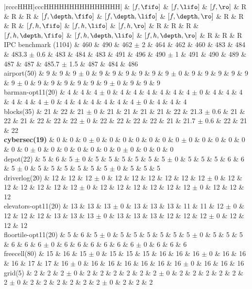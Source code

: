 \begin{center}
\begin{tabular}{|rcccHHH|cccHHHHHHHHHHHHHHH|}
\hline
 & \([f,\fifo]\) & \([f,\lifo]\) & \([f,\ro]\) & R & R & R & \([f,\depth,\fifo]\) & \([f,\depth,\lifo]\) & \([f,\depth,\ro]\) & R & R & R & \([f,h,\fifo]\) & \([f,h,\lifo]\) & \([f,h,\ro]\) & R & R & R & \([f,h,\depth,\fifo]\) & \([f,h,\depth,\lifo]\) & \([f,h,\depth,\ro]\) & R & R & R\\
\hline
IPC benchmark (1104) & 460 & 490 & 462 \(\pm\) 2 & 464 & 462 & 460 & 483 & 484 & 483.3 \(\pm\) 0.6 & 483 & 484 & 483 & 491 & 496 & 490 \(\pm\) 1 & 491 & 490 & 489 & 487 & 487 & 485.7 \(\pm\) 1.5 & 487 & 484 & 486\\
\hline
airport(50) & 9 & 9 & 9 \(\pm\) 0 & 9 & 9 & 9 & 9 & 9 & 9 \(\pm\) 0 & 9 & 9 & 9 & 9 & 9 & 9 \(\pm\) 0 & 9 & 9 & 9 & 9 & 9 & 9 \(\pm\) 0 & 9 & 9 & 9\\
barman-opt11(20) & 4 & 4 & 4 \(\pm\) 0 & 4 & 4 & 4 & 4 & 4 & 4 \(\pm\) 0 & 4 & 4 & 4 & 4 & 4 & 4 \(\pm\) 0 & 4 & 4 & 4 & 4 & 4 & 4 \(\pm\) 0 & 4 & 4 & 4\\
blocks(35) & 21 & 22 & 21 \(\pm\) 0 & 21 & 21 & 21 & 21 & 22 & 21.3 \(\pm\) 0.6 & 21 & 22 & 21 & 22 & 22 & 22 \(\pm\) 0 & 22 & 22 & 22 & 22 & 21 & 21.7 \(\pm\) 0.6 & 22 & 21 & 22\\
\textbf{cybersec(19)} & 0 & 0 & 0 \(\pm\) 0 & 0 & 0 & 0 & 0 & 0 & 0 \(\pm\) 0 & 0 & 0 & 0 & 0 & 0 & 0 \(\pm\) 0 & 0 & 0 & 0 & 0 & 0 & 0 \(\pm\) 0 & 0 & 0 & 0\\
depot(22) & 5 & 6 & 5 \(\pm\) 0 & 5 & 5 & 5 & 5 & 5 & 5 \(\pm\) 0 & 5 & 5 & 5 & 6 & 6 & 5 \(\pm\) 0 & 5 & 5 & 5 & 5 & 5 & 5 \(\pm\) 0 & 5 & 5 & 5\\
driverlog(20) & 12 & 12 & 12 \(\pm\) 0 & 12 & 12 & 12 & 12 & 12 & 12 \(\pm\) 0 & 12 & 12 & 12 & 12 & 12 & 12 \(\pm\) 0 & 12 & 12 & 12 & 12 & 12 & 12 \(\pm\) 0 & 12 & 12 & 12\\
elevators-opt11(20) & 13 & 13 & 13 \(\pm\) 0 & 13 & 13 & 13 & 11 & 11 & 12 \(\pm\) 0 & 12 & 12 & 12 & 13 & 13 & 13 \(\pm\) 0 & 13 & 13 & 13 & 12 & 12 & 12 \(\pm\) 0 & 12 & 12 & 12\\
floortile-opt11(20) & 5 & 6 & 5 \(\pm\) 0 & 5 & 5 & 5 & 5 & 5 & 5 \(\pm\) 0 & 5 & 5 & 5 & 6 & 6 & 6 \(\pm\) 0 & 6 & 6 & 6 & 6 & 6 & 6 \(\pm\) 0 & 6 & 6 & 6\\
freecell(80) & 15 & 16 & 15 \(\pm\) 0 & 15 & 15 & 15 & 16 & 16 & 16 \(\pm\) 0 & 16 & 16 & 16 & 17 & 17 & 16 \(\pm\) 0 & 16 & 16 & 16 & 16 & 16 & 16 \(\pm\) 0 & 16 & 16 & 16\\
grid(5) & 2 & 2 & 2 \(\pm\) 0 & 2 & 2 & 2 & 2 & 2 & 2 \(\pm\) 0 & 2 & 2 & 2 & 2 & 2 & 2 \(\pm\) 0 & 2 & 2 & 2 & 2 & 2 & 2 \(\pm\) 0 & 2 & 2 & 2\\

\end{tabular}
\end{center}
